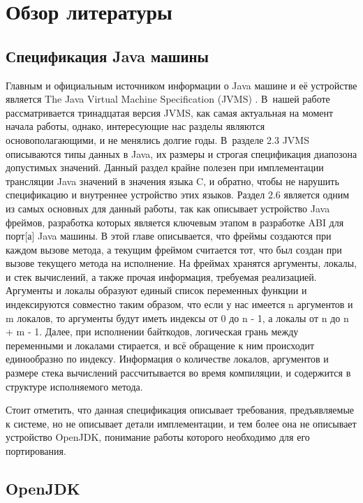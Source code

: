 \section*{Обзор литературы}

\subsection*{Спецификация Java машины}

Главным и официальным источником информации о Java машине и её устройстве является The Java Virtual Machine Specification (JVMS) \cite{jvms}. В~нашей работе рассматривается тринадцатая версия JVMS, как самая актуальная на момент начала работы, однако, интересующие нас разделы являются основополагающими, и не менялись долгие годы. 
В~разделе 2.3 JVMS описываются типы данных в Java, их размеры и строгая спецификация диапозона допустимых значений. Данный раздел крайне полезен при имплементации трансляции Java значений в значения языка C, и обратно, чтобы не нарушить спецификацию и внутреннее устройство этих языков. Раздел 2.6 является одним из самых основных для данный работы, так как описывает устройство Java фреймов, разработка которых является ключевым этапом в разработке ABI для \gls{порт}[а] Java машины. В этой главе описывается, что фреймы создаются при каждом вызове метода, а текущим фреймом считается тот, что был создан при вызове текущего метода на исполнение. На фреймах хранятся аргументы, локалы, и стек вычислений, а также прочая информация, требуемая реализацией. Аргументы и локалы образуют единый список переменных функции и индексируются совместно таким образом, что если у нас имеется n аргументов и m локалов, то аргументы будут иметь индексы от 0 до n - 1, а локалы от n до n + m - 1. Далее, при исполнении байткодов, логическая грань между переменными и локалами стирается, и всё обращение к ним происходит единообразно по индексу. Информация о количестве локалов, аргументов и размере стека вычислений рассчитывается во время компиляции, и содержится в структуре исполняемого метода.

Стоит отметить, что данная спецификация описывает требования, предъявляемые к системе, но не описывает детали имплементации, и тем более она не описывает устройство OpenJDK, понимание работы которого необходимо для его портирования.


\subsection*{OpenJDK}

